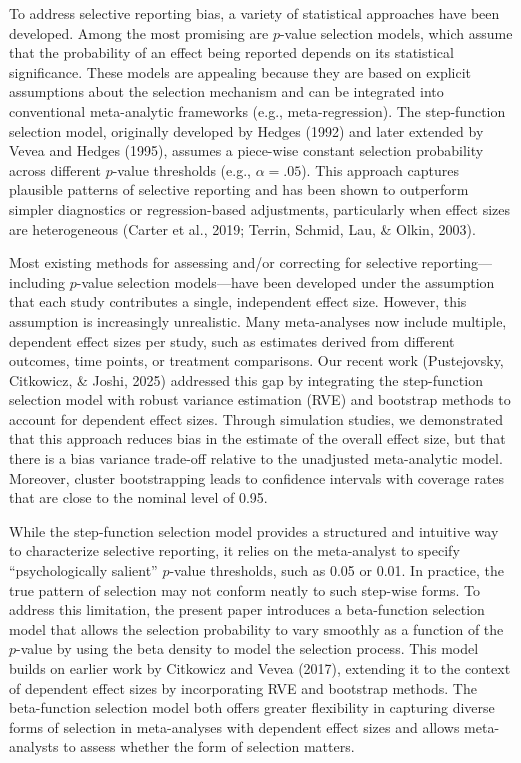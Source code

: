 \documentclass[
  american,
  man, donotrepeattitle,floatsintext]{apa7}
\begin{document}
To address selective reporting bias, a variety of statistical approaches have been developed. Among the most promising are \(p\)-value selection models, which assume that the probability of an effect being reported depends on its statistical significance. These models are appealing because they are based on explicit assumptions about the selection mechanism and can be integrated into conventional meta-analytic frameworks (e.g., meta-regression). The step-function selection model, originally developed by Hedges (1992) and later extended by Vevea and Hedges (1995), assumes a piece-wise constant selection probability across different \(p\)-value thresholds (e.g., \(\alpha = .05\)). This approach captures plausible patterns of selective reporting and has been shown to outperform simpler diagnostics or regression-based adjustments, particularly when effect sizes are heterogeneous (Carter et al., 2019; Terrin, Schmid, Lau, \& Olkin, 2003).

Most existing methods for assessing and/or correcting for selective reporting---including \(p\)-value selection models---have been developed under the assumption that each study contributes a single, independent effect size. However, this assumption is increasingly unrealistic. Many meta-analyses now include multiple, dependent effect sizes per study, such as estimates derived from different outcomes, time points, or treatment comparisons. Our recent work (Pustejovsky, Citkowicz, \& Joshi, 2025) addressed this gap by integrating the step-function selection model with robust variance estimation (RVE) and bootstrap methods to account for dependent effect sizes. Through simulation studies, we demonstrated that this approach reduces bias in the estimate of the overall effect size, but that there is a bias variance trade-off relative to the unadjusted meta-analytic model. Moreover, cluster bootstrapping leads to confidence intervals with coverage rates that are close to the nominal level of 0.95.

While the step-function selection model provides a structured and intuitive way to characterize selective reporting, it relies on the meta-analyst to specify ``psychologically salient'' \(p\)-value thresholds, such as 0.05 or 0.01. In practice, the true pattern of selection may not conform neatly to such step-wise forms. To address this limitation, the present paper introduces a beta-function selection model that allows the selection probability to vary smoothly as a function of the \(p\)-value by using the beta density to model the selection process. This model builds on earlier work by Citkowicz and Vevea (2017), extending it to the context of dependent effect sizes by incorporating RVE and bootstrap methods. The beta-function selection model both offers greater flexibility in capturing diverse forms of selection in meta-analyses with dependent effect sizes and allows meta-analysts to assess whether the form of selection matters.
\end{document}

